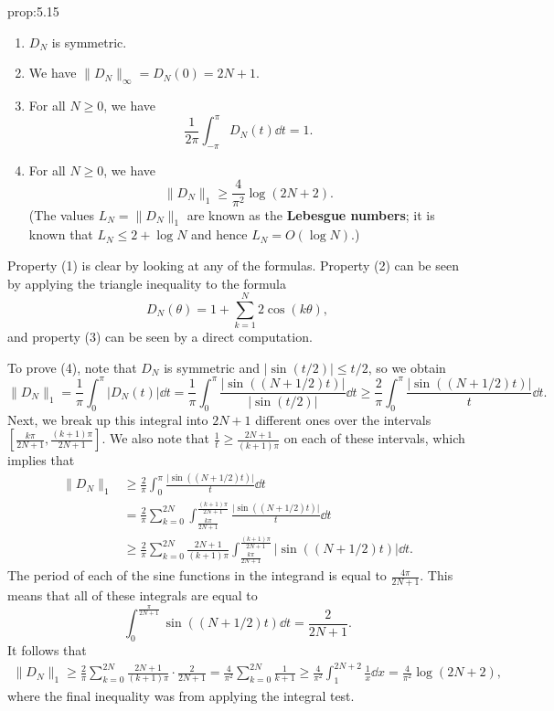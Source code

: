 \begin{prop}{prop:5.15}
    \begin{enumerate}[(1)]
        \item $D_N$ is symmetric. 
        \item We have $\|D_N\|_\infty = D_N(0) = 2N+1$. 
        \item For all $N \geq 0$, we have 
        \[ \frac{1}{2\pi} \int_{-\pi}^\pi D_N(t)\dd t = 1. \] 
        \item For all $N \geq 0$, we have 
        \[ \|D_N\|_1 \geq \frac{4}{\pi^2} \log(2N+2). \] 
        (The values $L_N = \|D_N\|_1$ are known as the {\bf Lebesgue numbers}; 
        it is known that $L_N \leq 2 + \log N$ and hence $L_N = O(\log N)$.)
    \end{enumerate}
\end{prop}
\begin{pf}
    Property (1) is clear by looking at any of the formulas. Property (2) can be 
    seen by applying the triangle inequality to the formula 
    \[ D_N(\theta) = 1 + \sum_{k=1}^N 2\cos(k\theta), \] 
    and property (3) can be seen by a direct computation. 

    To prove (4), note that $D_N$ is symmetric and $\lvert \sin(t/2) \rvert \leq t/2$, 
    so we obtain 
    \[ \|D_N\|_1 = \frac1\pi \int_0^\pi |D_N(t)|\dd t 
    = \frac1\pi \int_0^\pi \frac{\lvert\sin((N+1/2)t)\rvert}{\lvert\sin(t/2)\rvert}\dd t 
    \geq \frac{2}{\pi} \int_0^\pi \frac{\lvert\sin((N+1/2)t)\rvert}{t}\dd t. \] 
    Next, we break up this integral into $2N+1$ different ones over the intervals 
    $[\frac{k\pi}{2N+1}, \frac{(k+1)\pi}{2N+1}]$. We also note that 
    $\frac1t \geq \frac{2N+1}{(k+1)\pi}$ on each of these intervals, which implies that 
    \begin{align*}
        \|D_N\|_1 
        &\geq \frac{2}{\pi} \int_0^\pi \frac{\lvert\sin((N+1/2)t)\rvert}{t}\dd t \\ 
        &= \frac{2}{\pi} \sum_{k=0}^{2N} \int_{\frac{k\pi}{2N+1}}^{\frac{(k+1)\pi}{2N+1}} 
        \frac{\lvert\sin((N+1/2)t)\rvert}{t}\dd t \\ 
        &\geq \frac{2}{\pi} \sum_{k=0}^{2N} \frac{2N+1}{(k+1)\pi} 
        \int_{\frac{k\pi}{2N+1}}^{\frac{(k+1)\pi}{2N+1}} \lvert\sin((N+1/2)t)\rvert\dd t. 
    \end{align*}
    The period of each of the sine functions in the integrand is equal to 
    $\frac{4\pi}{2N+1}$. This means that all of these integrals are equal to 
    \[ \int_0^{\frac{\pi}{2N+1}} \sin((N+1/2)t)\dd t = \frac{2}{2N+1}. \] 
    It follows that 
    \begin{align*}
        \|D_N\|_1 \geq \frac{2}{\pi} \sum_{k=0}^{2N} \frac{2N+1}{(k+1)\pi} \cdot \frac{2}{2N+1} 
        = \frac{4}{\pi^2} \sum_{k=0}^{2N} \frac{1}{k+1} 
        \geq \frac{4}{\pi^2} \int_1^{2N+2} \frac1x\dd x 
        = \frac{4}{\pi^2} \log(2N+2), 
    \end{align*}
    where the final inequality was from applying the integral test. 
\end{pf}

